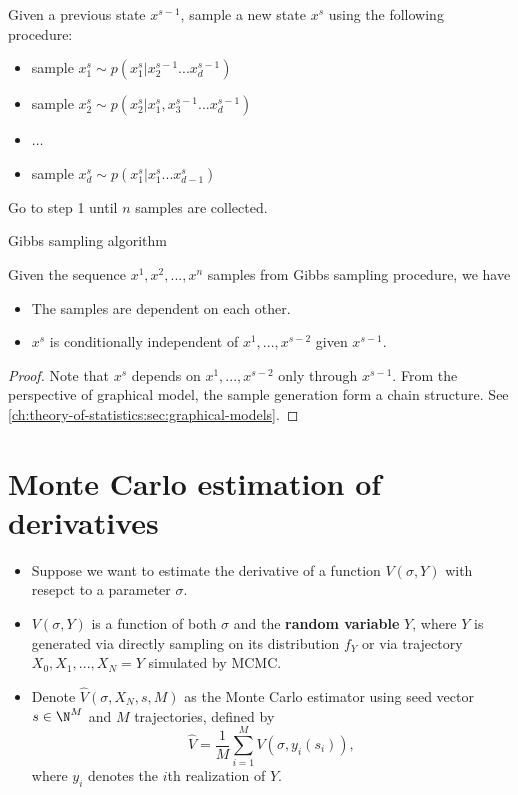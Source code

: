 \begin{refsection}
\begin{algorithm}[H]
	\SetAlgoLined
	Given a previous state $x^{s-1}$, sample a new state $x^{s}$ using the following procedure:
	\begin{itemize}
		\item sample $x^{s}_1 \sim p(x^s_1|x_2^{s-1} ... x_d^{s-1})$
		\item sample $x^{s}_2 \sim p(x^s_2|x_1^s,x_3^{s-1} ... x_d^{s-1})$
		\item $\dots$
		\item sample $x^{s}_d \sim p(x^s_1|x_1^s ... x_{d-1}^{s})$
	\end{itemize}
	Go to step 1 until $n$ samples are collected.\\
	\caption{Gibbs sampling algorithm}
\end{algorithm}

\begin{lemma}
	Given the sequence $x^1,x^2,...,x^n$ samples from Gibbs sampling procedure, we have
	\begin{itemize}
		\item The samples are dependent on each other. 
		\item $x^s$ is conditionally independent of $x^1,...,x^{s-2}$ given $x^{s-1}$.
	\end{itemize}
	
\end{lemma}
\begin{proof}
	Note that $x^s$ depends on $x^1,...,x^{s-2}$ only through $x^{s-1}$. From the perspective of graphical model, the sample generation form a chain structure. See \autoref{ch:theory-of-statistics:sec:graphical-models}.
\end{proof}

\section{Monte Carlo estimation of derivatives}

\begin{definition}[setup]\hfill
\begin{itemize}
	\item Suppose we want to estimate the derivative of a function $V(\sigma, Y)$ with resepct to a parameter $\sigma$.
	\item $V(\sigma, Y)$ is a function of both $\sigma$ and the \textbf{random variable }$Y$, where $Y$ is generated via directly sampling on its distribution $f_Y$ or via trajectory $X_0, X_1,...,X_N = Y$ simulated by MCMC. 
	\item Denote $\hat{V}(\sigma, X_N, s, M)$ as the Monte Carlo estimator using seed vector $s\in \N^M$ and $M$ trajectories, defined by
	$$\hat{V} = \frac{1}{M} \sum_{i=1}^M V(\sigma, y_i(s_i)),$$
	where $y_i$ denotes the $i$th realization of $Y$.
\end{itemize}	
\end{definition}



\end{refsection}
